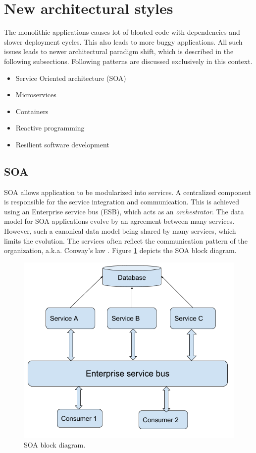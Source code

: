 \documentclass[conference]{IEEEtran}
\begin{document}
\section{New architectural styles}
The monolithic applications causes lot of bloated code with dependencies and slower deployment cycles. This also leads to more buggy applications.
All such issues leads to newer architectural paradigm shift, which is described in the following subsections. Following patterns are discussed exclusively in this context.
\begin{itemize}
\item Service Oriented architecture (SOA)
\item Microservices
\item Containers
\item Reactive programming
\item Resilient software development
\end{itemize}

\subsection{SOA}
SOA \cite{SOA} allows application to be modularized into services. A centralized component is responsible for the service integration and communication.
This is achieved using an Enterprise service bus (ESB), which acts as an \textit{orchestrator}. The data model for SOA applications evolve by an agreement between many services.
However, such a canonical data model being shared by many services, which limits the evolution. The services often reflect the communication pattern of the organization, a.k.a. Conway's law \cite{conway}. Figure \ref{soaBlockDiagram} depicts the SOA block diagram.

\begin{figure}[htbp]
\centerline{\includegraphics[scale=0.4]{SOA.png}}
\caption{SOA block diagram.}
\label{soaBlockDiagram}
\end{figure}
\end{document}

